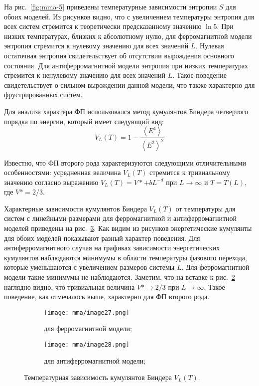 На рис.~\ref{fig:mma-5} приведены температурные зависимости энтропии $S$ для обоих моделей. Из рисунков видно, что с увеличением температуры энтропия для всех систем стремится к теоретически предсказанному значению $\ln 5$. При низких температурах, близких к абсолютному нулю, для ферромагнитной модели энтропия стремится к нулевому значению для всех значений $L$. Нулевая остаточная энтропия свидетельствует об отсутствии вырождения основного состояния. Для антиферромагнитной модели энтропия при низких температурах стремится к ненулевому значению для всех значений $L$. Такое поведение свидетельствует о сильном вырождении данной модели, что также характерно для фрустрированных систем.

Для анализа характера ФП использовался метод кумулянтов Биндера четвертого порядка по энергии, который имеет следующий вид:
\begin{equation*}
    V_L (T) = 1 - \frac{\left<E^4\right>}{\left<E^2\right>^2}
\end{equation*}

Известно, что ФП второго рода характеризуются следующими отличительными особенностями: усредненная величина $V_L (T)$ стремится к тривиальному значению согласно выражению $V_L (T) = V* + b L^{-d}$ при $L \to \infty$ и $T = T(L)$, где $V* = 2/3$.

Характерные зависимости кумулянтов Биндера $V_L(T)$ от температуры для систем с линейными размерами для ферромагнитной и антиферромагнитной моделей приведены на рис.~\ref{fig:mma-6}. Как видим из рисунков энергетические кумулянты для обоих моделей показывают разный характер поведения. Для антиферромагнитного случая на графиках зависимости энергетических кумулянтов наблюдаются минимумы в области температуры фазового перехода, которые уменьшаются с увеличением размеров системы $L$. Для ферромагнитной модели такие минимумы не наблюдаются. Заметим, что на вставке к рис.~\ref{fig:mma-6b} наглядно видно, что тривиальная величина $V* \to 2/3$ при $L \to \infty$. Такое поведение, как отмечалось выше, характерно для ФП второго рода.
\begin{figure}[ht]
    \centering
    \begin{subfigure}{0.45\textwidth}
        \texttt{[image: mma/image27.png]}
        \caption{для ферромагнитной модели;}
        \label{fig:mma-6a}
    \end{subfigure}
    \begin{subfigure}{0.45\textwidth}
        \texttt{[image: mma/image28.png]}
        \caption{для антиферромагнитной модели;}
        \label{fig:mma-6b}
    \end{subfigure}
    \caption{Температурная зависимость кумулянтов Биндера $V_L (T)$.}
    \label{fig:mma-6}
\end{figure}

